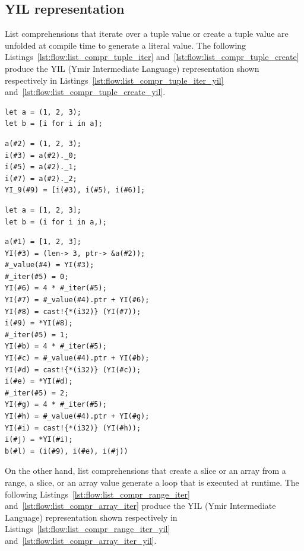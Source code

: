 \subsection{YIL representation}

List comprehensions that iterate over a tuple value or create a tuple value are
unfolded at compile time to generate a literal value. The following
Listings~\ref{lst:flow:list_compr_tuple_iter} and~\ref{lst:flow:list_compr_tuple_create}
produce the YIL (Ymir Intermediate Language) representation shown respectively
in Listings~\ref{lst:flow:list_compr_tuple_iter_yil}
and~\ref{lst:flow:list_compr_tuple_create_yil}.

\begin{lstlisting}[style=coloredverbatim, label=lst:flow:list_compr_tuple_iter, caption=List comprehension iterating over a tuple]
let a = (1, 2, 3);
let b = [i for i in a];
\end{lstlisting}

\begin{lstlisting}[style=lyilVerb, label=lst:flow:list_compr_tuple_iter_yil, caption=YIL representation of Listing~\ref{lst:flow:list_compr_tuple_iter}]
a(#2) = (1, 2, 3);
i(#3) = a(#2)._0;
i(#5) = a(#2)._1;
i(#7) = a(#2)._2;
YI_9(#9) = [i(#3), i(#5), i(#6)];
\end{lstlisting}

\begin{lstlisting}[style=coloredverbatim, label=lst:flow:list_compr_tuple_create, caption=List comprehension iterating over a tuple]
let a = [1, 2, 3];
let b = (i for i in a,);
\end{lstlisting}

\begin{lstlisting}[style=lyilVerb, label=lst:flow:list_compr_tuple_create_yil, caption=YIL representation of Listing~\ref{lst:flow:list_compr_tuple_create}]
a(#1) = [1, 2, 3];
YI(#3) = (len-> 3, ptr-> &a(#2));
#_value(#4) = YI(#3);
#_iter(#5) = 0;
YI(#6) = 4 * #_iter(#5);
YI(#7) = #_value(#4).ptr + YI(#6);
YI(#8) = cast!{*(i32)} (YI(#7));
i(#9) = *YI(#8);
#_iter(#5) = 1;
YI(#b) = 4 * #_iter(#5);
YI(#c) = #_value(#4).ptr + YI(#b);
YI(#d) = cast!{*(i32)} (YI(#c));
i(#e) = *YI(#d);
#_iter(#5) = 2;
YI(#g) = 4 * #_iter(#5);
YI(#h) = #_value(#4).ptr + YI(#g);
YI(#i) = cast!{*(i32)} (YI(#h));
i(#j) = *YI(#i);
b(#l) = (i(#9), i(#e), i(#j))
\end{lstlisting}

On the other hand, list comprehensions that create a slice or an array from a
range, a slice, or an array value generate a loop that is executed at runtime.
The following Listings~\ref{lst:flow:list_compr_range_iter}
and~\ref{lst:flow:list_compr_array_iter} produce the YIL (Ymir Intermediate Language)
representation shown respectively in
Listings~\ref{lst:flow:list_compr_range_iter_yil}
and~\ref{lst:flow:list_compr_array_iter_yil}.


